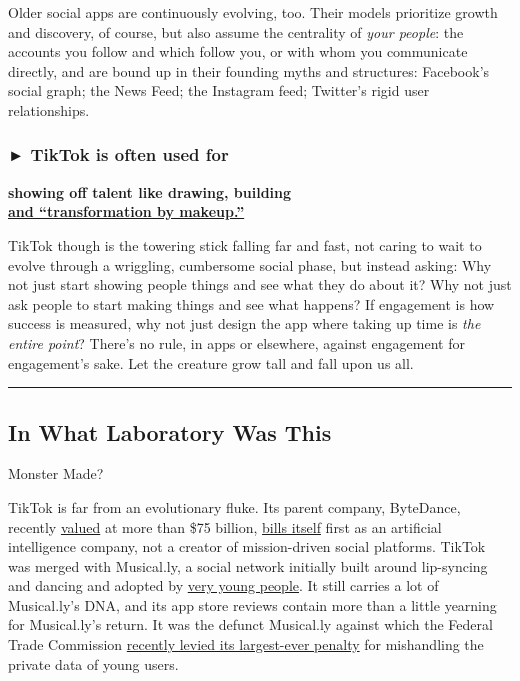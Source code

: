 Older social apps are continuously evolving, too. Their models
prioritize growth and discovery, of course, but also assume the
centrality of \emph{your people}: the accounts you follow and which
follow you, or with whom you communicate directly, and are bound up in
their founding myths and structures: Facebook's social graph; the News
Feed; the Instagram feed; Twitter's rigid user relationships.

\hypertarget{-tiktok-is-often-used-for}{%
\subsubsection{\texorpdfstring{► \textbf{TikTok is often used
for}}{► TikTok is often used for}}\label{-tiktok-is-often-used-for}}

\textbf{showing off talent like drawing, building}\\
\textbf{\href{https://www.tiktok.com/share/video/6661522824781450497}{and
``transformation by makeup.''}}

TikTok though is the towering stick falling far and fast, not caring to
wait to evolve through a wriggling, cumbersome social phase, but instead
asking: Why not just start showing people things and see what they do
about it? Why not just ask people to start making things and see what
happens? If engagement is how success is measured, why not just design
the app where taking up time is \emph{the entire point}? There's no
rule, in apps or elsewhere, against engagement for engagement's sake.
Let the creature grow tall and fall upon us all.

\begin{center}\rule{0.5\linewidth}{\linethickness}\end{center}

\hypertarget{in-what-laboratory-was-this}{%
\subsection{In What Laboratory Was
This}\label{in-what-laboratory-was-this}}

Monster Made?

TikTok is far from an evolutionary fluke. Its parent company, ByteDance,
recently
\href{https://www.theverge.com/2018/10/26/18026250/bytedance-china-tiktok-valuation-highest-toutiao}{valued}
at more than \$75 billion, \href{https://bytedance.com/}{bills itself}
first as an artificial intelligence company, not a creator of
mission-driven social platforms. TikTok was merged with Musical.ly, a
social network initially built around lip-syncing and dancing and
adopted by
\href{https://www.nytimes.com/2016/09/17/business/media/a-social-network-frequented-by-children-tests-the-limits-of-online-regulation.html?module=inline}{very
young people}. It still carries a lot of Musical.ly's DNA, and its app
store reviews contain more than a little yearning for Musical.ly's
return. It was the defunct Musical.ly against which the Federal Trade
Commission
\href{https://www.nytimes.com/2019/02/27/technology/ftc-tiktok-child-privacy-fine.html}{recently
levied its largest-ever penalty} for mishandling the private data of
young users.

